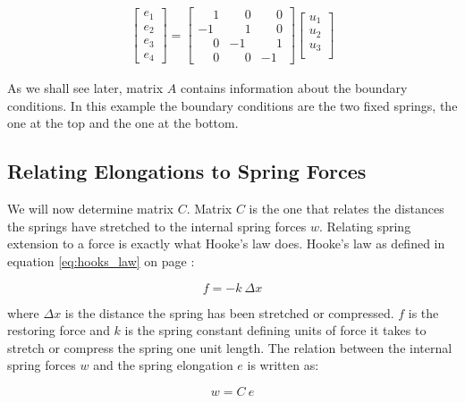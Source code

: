 \begin{align}
\begin{bmatrix}
e_1 \\ e_2\\ e_3 \\ e_4
\end{bmatrix}
=
\begin{bmatrix}
 \phantom{-}1 & \phantom{-}0 & \phantom{-}0 \\
           -1 & \phantom{-}1 & \phantom{-}0 \\
 \phantom{-}0 &           -1 & \phantom{-}1 \\
 \phantom{-}0 & \phantom{-}0 &           -1
\end{bmatrix}
\begin{bmatrix}
u_1 \\ u_2 \\ u_3 \\
\end{bmatrix}
\end{align}

As we shall see later, matrix $A$ contains information about the
boundary conditions. In this example the boundary conditions are the
two fixed springs, the one at the top and the one at the bottom. \\


\subsection{Relating Elongations to Spring Forces}
We will now determine matrix $C$. 
Matrix $C$ is the one that relates the distances the springs have
stretched to the internal spring forces $w$. Relating spring
extension to a force is exactly what Hooke's law does. Hooke's law as
defined in equation \eqref{eq:hooks_law} on page \pageref{eq:hooks_law}:

\begin{equation*}
f = -k \ \Delta x 
\end{equation*}

where $\Delta x$ is the distance the spring has been stretched or
compressed. $f$ is the restoring force and $k$ is the spring
constant defining units of force it takes to stretch or compress the
spring one unit length. The relation between the internal spring
forces $w$ and the spring elongation $e$ is written as:

\begin{equation}
\label{eq:w_related_to_e}
w = C \ e  
\end{equation}

